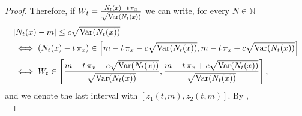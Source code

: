 \documentclass{article}
\newcommand{\inote}[1]{{\color{blue} ({\bf Isa:} #1)}}
\begin{document}
\begin{proof}
    Therefore, if $W_t = \frac{N_t(x) - t \, \pi_x}{\sqrt{\mathrm{Var}(N_t(x))}}$ we can write, for every $N \in \mathbb{N}$
    \begin{align*}
       & |N_t(x) - m| \leq c \sqrt{\mathrm{Var}(N_t(x))} \\ &\iff (N_t(x) - t \, \pi_x) \in \left[ m - t \, \pi_x - c\sqrt{\mathrm{Var}(N_t(x))} , m - t \, \pi_x + c\sqrt{\mathrm{Var}(N_t(x))} \right] \\
        &\iff W_t \in \left[ \frac{m - t \, \pi_x - c\sqrt{\mathrm{Var}(N_t(x))}}{\sqrt{\mathrm{Var}(N_t(x))}} , \frac{m - t \, \pi_x + c\sqrt{\mathrm{Var}(N_t(x))}}{\sqrt{\mathrm{Var}(N_t(x))}} \right],
    \end{align*}
    and we denote the last interval with $ \left[ z_1(t,m) , z_2(t,m) \right]$.
    By ,
    \begin{equation}

\end{equation}
\end{proof}
\end{document}
